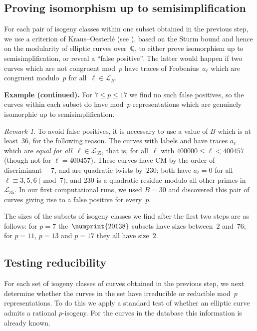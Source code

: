 \documentclass[12pt, reqno]{amsart}
\newcommand{\lmfdbec}[3]{\href{http://www.lmfdb.org/EllipticCurve/Q/#1#2#3}{{\text{\rm#1#2#3}}}}
\newcommand{\Q}{\mathbb{Q}}
\newcommand{\calL}{\mathcal{L}}
\numberwithin{equation}{section}
\theoremstyle{definition}
\theoremstyle{remark}
\newtheorem{remark}[theorem]{Remark}
\begin{document}
\subsection{Proving isomorphism up to semisimplification}

For each pair of isogeny classes within one subset obtained in the
previous step, we use a criterion of Kraus--Oesterl\'e (see
\cite[Proposition~4]{KO}), based on the Sturm bound and hence on the
modularity of elliptic curves over~$\Q$, to either prove isomorphism
up to semisimplification, or reveal a ``false positive''.  The latter
would happen if two curves which are not congruent mod~$p$ have traces
of Frobenius~$a_{\ell}$ which are congruent modulo~$p$ for
all~$\ell\in\calL_B$.

{\bf Example (continued).}  For $7\le p\le17$ we find no such false
positives, so the curves within each subset do have mod~$p$
representations which are genuinely isomorphic up to
semisimplification.

\begin{remark}
  To avoid false positives, it is necessary to use a value of $B$
  which is at least~$36$, for the following reason.  The curves with
  labels \lmfdbec{25921}{a}{1} and \lmfdbec{78400}{gw}{1} have traces
  $a_{\ell}$ which are \emph{equal for all~$\ell\in\calL_{35}$}, that
  is, for all~$\ell$ with $400000\le \ell<400457$ (though not for
  $\ell=400457$).  These curves have CM by the order of
  discriminant~$-7$, and are quadratic twists by~$230$; both have
  $a_\ell=0$ for all $\ell\equiv3,5,6\pmod{7}$, and $230$ is a
  quadratic residue modulo all other primes in~$\calL_{35}$. In our
  first computational runs, we used $B=30$ and discovered this pair of
  curves giving rise to a false positive for every~$p$.
\end{remark}

The sizes of the subsets of isogeny classes we find after the first
two steps are as follows: for $p=7$ the~$\numprint{20138}$ subsets
have sizes between~$2$ and~$76$; for $p=11$, $p=13$ and $p=17$ they
all have size~$2$.


\subsection{Testing reducibility}
For each set of isogeny classes of curves obtained in the previous
step, we next determine whether the curves in the set have irreducible
or reducible mod~$p$ representations.  To do this we apply a standard
test of whether an elliptic curve admits a rational $p$-isogeny.  For
the curves in the database this information is already known.
\end{document}
